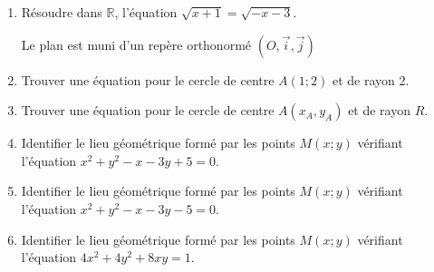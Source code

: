 \documentclass{book}
\begin{document}

\fontsize{10}{12}\selectfont

\begin{enumerate}
 \item Résoudre dans $\mathbb{R}$, l'équation $\sqrt{x+1}=\sqrt{-x-3}$.
 
 Le plan est muni d'un repère orthonormé $(O, \vec{i},\vec{j})$
 \item Trouver une équation pour le cercle de centre $A(1;2)$ et de rayon 2.
 \item Trouver une équation pour le cercle de centre $A(x_A,y_A)$ et de rayon $R$.
 \item Identifier le lieu géométrique formé par les points $M(x;y)$ vérifiant l'équation
 $x^2+y^2-x-3y+5=0$.
 \item Identifier le lieu géométrique formé par les points $M(x;y)$ vérifiant l'équation
 $x^2+y^2-x-3y-5=0$.
 \item Identifier le lieu géométrique formé par les points $M(x;y)$ vérifiant l'équation
 $4x^2+4y^2+8xy=1$.
\end{enumerate}
\end{document}
